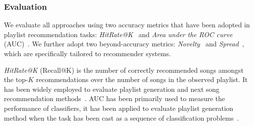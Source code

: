 \begin{itemize}
\end{itemize}


\subsubsection{Evaluation}

We evaluate %
all approaches using two accuracy metrics that have been adopted 
in playlist recommendation tasks:
\emph{HitRate@K}~\cite{hariri2012context} and \emph{Area under the ROC curve} (AUC)~\cite{manning2008introIR}.
We further adopt two beyond-accuracy metrics: %
\emph{Novelty}~\cite{zhang2012auralist,schedl2017} and \emph{Spread}~\cite{kluver2014evaluating},
which are specifically tailored to recommender systems.
%

\emph{HitRate@K} (\ie Recall@K) 
is the number of correctly recommended songs amongst the top-$K$ recommendations over
the number of songs in the %
observed playlist.
It has been widely employed to evaluate %
playlist generation and next song recommendation
methods~\cite{hariri2012context,bonnin2013evaluating,bonnin2015automated,jannach2015beyond}.
%
AUC has been primarily used to measure the performance of classifiers,
it has been applied to evaluate %
playlist generation method when the task
has been cast as a sequence of classification problems~\cite{ben2017groove}.

